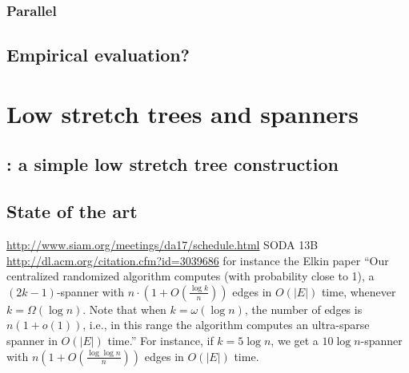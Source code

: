 \documentclass[nobib, a4paper, 10pt, oneside, onecolumn, openany, notitlepage, final,
svgnames, marginals=raggedouter, english,
]{article}
\begin{document}
\iffalse
Haris Angelidakis, Konstantin Makarychev, and Yury Makarychev. 2017.
Algorithms for Stable and Perturbation-Resilient Problems. STOC’17
\href{http://ttic.uchicago.edu/~yury/papers/two-stable.pdf}{10.1145/3055399.3055487}
improves over the one cited in the internship description
\fi

\subsubsection{Parallel \pcc{}}
\label{ssub:parallel_cc}

\subsection{Empirical evaluation?}
\label{sub:cc_empiracal_evaluation}

\newpage

\section{Low stretch trees and spanners}
\label{sec:low_stretch_trees_and_spanners}



\subsection{\gtx{}: a simple low stretch tree construction}
\label{sub:gtx_a_simple_low_stretch_tree_construction}



\subsection{State of the art}
\label{sub:gtx_state_of_the_art}

\iffalse
\url{http://www.siam.org/meetings/da17/schedule.html} SODA 13B \url{http://dl.acm.org/citation.cfm?id=3039686}
for instance the Elkin paper \enquote{Our centralized randomized algorithm computes (with
probability close to 1), a $(2k - 1)$-spanner with $n \cdot (1 + O(\frac{\log k}{n}))$ edges in
$O(|E|)$ time, whenever $k = \Omega(\log n)$. Note that when $k = \omega(\log n)$, the number of
edges is $n(1+o(1))$, i.e., in this range the algorithm computes an ultra-sparse spanner in $O(|E|)$
time.} For instance, if $k=5\log n$, we get a $10\log n$-spanner with $n\left(1+O\left(\frac{\log\log
n}{n}\right)\right)$ edges in $O(|E|)$ time.
\end{document}

